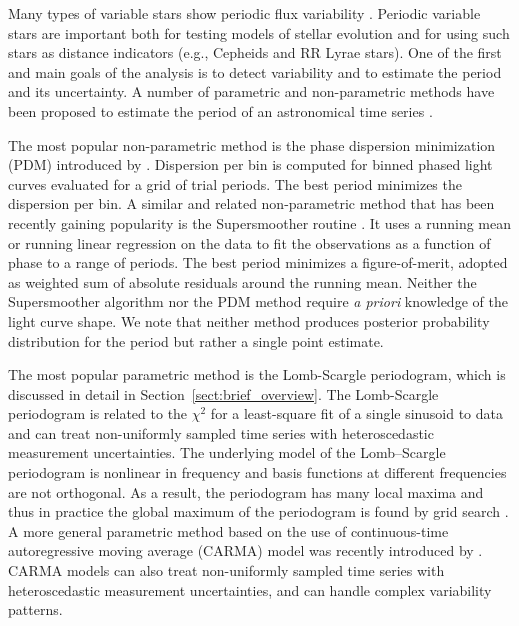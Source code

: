 \documentclass{emulateapj}
\newcommand{\foreign}[1]{{\it #1}}
\newcommand{\apriori}{\foreign{a priori}}
\newcommand{\Sect}[1]{Section~\ref{sect:#1}}
\newcommand{\sect}[1]{\Sect{#1}}
\begin{document}
Many types of variable stars show periodic flux variability \citep{EM2008}. Periodic variable stars are important 
both for testing models of stellar evolution and for using such stars as distance indicators (e.g., Cepheids 
and RR Lyrae stars). One of the first and main goals of the analysis is to detect variability and to estimate the 
period and its uncertainty. A number of parametric and non-parametric methods have been proposed to 
estimate the period of an astronomical time series \citep[e.g.,][and references therein]{Graham13}.

The most popular non-parametric method is the phase dispersion minimization (PDM) introduced by \cite{PDM1978}. 
Dispersion per bin is computed for binned phased light curves evaluated for a grid of trial periods. The best
period minimizes the dispersion per bin.  A similar and related non-parametric method that has been recently 
gaining popularity is the Supersmoother routine \citep{Reimann94}. It uses a running mean or running linear 
regression on the data to fit the observations as a function of phase to a range of periods. The best period 
minimizes a figure-of-merit, adopted as weighted sum of absolute residuals around the running mean. 
Neither the Supersmoother algorithm nor the PDM method require \apriori{} knowledge of the light curve shape. 
We note that neither method produces posterior probability distribution for the period but rather a single point 
estimate. 

The most popular parametric method is the Lomb-Scargle periodogram, which is discussed in detail in \sect{brief_overview}.
The Lomb-Scargle periodogram is related to the $\chi^2$ for a least-square fit of a single sinusoid to data
and can treat non-uniformly sampled time series with heteroscedastic measurement uncertainties. 
The underlying model of the Lomb–Scargle periodogram is nonlinear in frequency and basis functions at different
frequencies are not orthogonal. As a result, the periodogram has many local maxima and thus in practice the global 
maximum of the periodogram is found by grid search \citep[for details see, e.g.][]{ICVG2014}.
A more general parametric method based on the use of continuous-time autoregressive moving average (CARMA) model
was recently introduced by \citet{Kelly14}. CARMA models can also treat non-uniformly sampled time series with 
heteroscedastic measurement uncertainties, and can handle complex variability patterns. 
\end{document}

